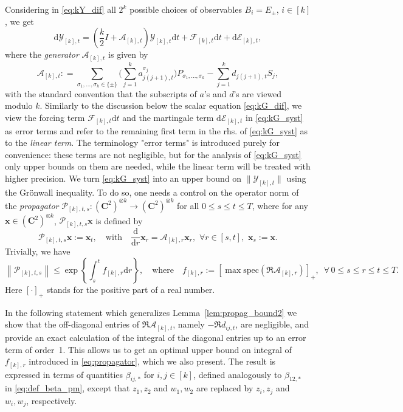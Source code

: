 \documentclass[10pt]{amsart}
\numberwithin{equation}{section}
\newcommand{\dif}{\mathrm{d}}
\newcommand{\C}{\mathbf{C}}
\begin{document}
Considering in \eqref{eq:kY_dif} all $2^k$ possible choices of observables $B_i=E_\pm$, $i\in [k]$, we get
\begin{equation}
\dif \mathcal{Y}_{[k],t}= \left(\frac{k}{2}I + \mathcal{A}_{[k],t}\right)\mathcal{Y}_{[k],t}\dif t + \mathcal{F}_{[k],t}\dif t +\dif\mathcal{E}_{[k],t},
\label{eq:kG_syst}
\end{equation}
where the \emph{generator} $\mathcal{A}_{[k],t}$ is given by
\begin{equation}
\mathcal{A}_{[k],t}: = \sum_{\sigma_1,\ldots,\sigma_k\in\{\pm\}} \bigg(\sum_{j=1}^k a_{j(j+1),t}^{\sigma_j}\bigg)P_{\sigma_1,\ldots,\sigma_k} - \sum_{j=1}^k d_{j(j+1),t}S_j, 
\label{eq:def_general_A}
\end{equation}
with the standard convention that the subscripts of $a$'s and $d$'s are viewed modulo $k$. Similarly to the discussion below the scalar equation \eqref{eq:kG_dif}, we view the forcing term $\mathcal{F}_{[k],t}\dif t$ and the martingale term $\dif\mathcal{E}_{[k],t}$ in \eqref{eq:kG_syst} as error terms and refer to the remaining first term in the rhs. of \eqref{eq:kG_syst} as to the \emph{linear term}. The terminology "error terms" is introduced purely for convenience: these terms are not negligible, but for the analysis of \eqref{eq:kG_syst} only upper bounds on them are needed, while the linear term will be treated with higher precision. We turn \eqref{eq:kG_syst} into an upper bound on $\|\mathcal{Y}_{[k],t}\|$ using the Gr{\" o}nwall inequality. To do so, one needs a control on the operator norm of the \emph{propagator} $\mathcal{P}_{[k],t,s}:(\C^2)^{\otimes k}\to (\C^2)^{\otimes k}$ for all $0\le s\le t\le T$, where for any $\bm{x}\in (\C^2)^{\otimes k}$, $\mathcal{P}_{[k],t,s}\bm{x}$ is defined by
\begin{equation}
\mathcal{P}_{[k],t,s} \bm{x}:=\bm{x}_t,\quad \text{with}\quad \frac{\dif}{\dif r} \bm{x}_r=\mathcal{A}_{[k],r}\bm{x}_r,\,\,\forall r\in [s,t],\,\, \bm{x}_s:=\bm{x}.
\end{equation}
Trivially, we have
\begin{equation}
\left\lVert \mathcal{P}_{[k],t,s}\right\rVert\le \exp\left\lbrace \int_s^t f_{[k],r}\dif r\right\rbrace,\quad \text{where}\quad f_{[k],r}:=\left[ \max \mathrm{spec}(\Re \mathcal{A}_{[k],r})\right]_+,\,\,\,\forall\, 0\le s\le r\le t\le T.
\label{eq:propagator}
\end{equation}
Here $[\cdot]_+$ stands for the positive part of a real number.

In the following statement which generalizes Lemma~\ref{lem:propag_bound2} we show that the off-diagonal entries of $\Re \mathcal{A}_{[k],t}$, namely $-\Re d_{ij,t}$, are negligible, and provide an exact calculation of the integral of the diagonal entries up to an error term of order~1. This allows us to get an optimal upper bound on integral of $f_{[k],r}$ introduced in \eqref{eq:propagator}, which we also present. The result is expressed in terms of quantities $\beta_{ij,*}$ for $i,j\in [k]$,  defined analogously to $\beta_{12,*}$ in \eqref{eq:def_beta_pm}, except that $z_1,z_2$ and $w_1,w_2$ are replaced by $z_i,z_j$ and $w_i,w_j$, respectively.
\end{document}
